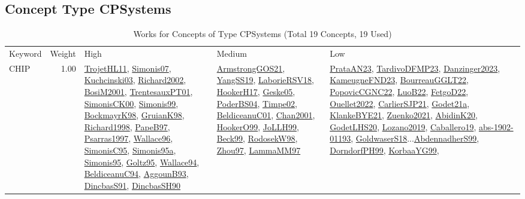 \subsection{Concept Type CPSystems}
\label{sec:CPSystems}
\label{CPSystems}
{\scriptsize
\begin{longtable}{p{3cm}r>{\raggedright\arraybackslash}p{6cm}>{\raggedright\arraybackslash}p{6cm}>{\raggedright\arraybackslash}p{8cm}}
\rowcolor{white}\caption{Works for Concepts of Type CPSystems (Total 19 Concepts, 19 Used)}\\ \toprule
\rowcolor{white}Keyword & Weight & High & Medium & Low\\ \midrule\endhead
\bottomrule
\endfoot
\index{CHIP}\index{CPSystems!CHIP}CHIP &  1.00 & \hyperref[detail:TrojetHL11]{TrojetHL11}, \hyperref[detail:Simonis07]{Simonis07}, \hyperref[detail:Kuchcinski03]{Kuchcinski03}, \hyperref[detail:Richard2002]{Richard2002}, \hyperref[detail:BosiM2001]{BosiM2001}, \hyperref[detail:TrentesauxPT01]{TrentesauxPT01}, \hyperref[detail:SimonisCK00]{SimonisCK00}, \hyperref[detail:Simonis99]{Simonis99}, \hyperref[detail:BockmayrK98]{BockmayrK98}, \hyperref[detail:GruianK98]{GruianK98}, \hyperref[detail:Richard1998]{Richard1998}, \hyperref[detail:PapeB97]{PapeB97}, \hyperref[detail:Psarras1997]{Psarras1997}, \hyperref[detail:Wallace96]{Wallace96}, \hyperref[detail:SimonisC95]{SimonisC95}, \hyperref[detail:Simonis95a]{Simonis95a}, \hyperref[detail:Simonis95]{Simonis95}, \hyperref[detail:Goltz95]{Goltz95}, \hyperref[detail:Wallace94]{Wallace94}, \hyperref[detail:BeldiceanuC94]{BeldiceanuC94}, \hyperref[detail:AggounB93]{AggounB93}, \hyperref[detail:DincbasS91]{DincbasS91}, \hyperref[detail:DincbasSH90]{DincbasSH90} & \hyperref[detail:ArmstrongGOS21]{ArmstrongGOS21}, \hyperref[detail:YangSS19]{YangSS19}, \hyperref[detail:LaborieRSV18]{LaborieRSV18}, \hyperref[detail:HookerH17]{HookerH17}, \hyperref[detail:Geske05]{Geske05}, \hyperref[detail:PoderBS04]{PoderBS04}, \hyperref[detail:Timpe02]{Timpe02}, \hyperref[detail:BeldiceanuC01]{BeldiceanuC01}, \hyperref[detail:Chan2001]{Chan2001}, \hyperref[detail:HookerO99]{HookerO99}, \hyperref[detail:JoLLH99]{JoLLH99}, \hyperref[detail:Beck99]{Beck99}, \hyperref[detail:RodosekW98]{RodosekW98}, \hyperref[detail:Zhou97]{Zhou97}, \hyperref[detail:LammaMM97]{LammaMM97} & \hyperref[detail:PrataAN23]{PrataAN23}, \hyperref[detail:TardivoDFMP23]{TardivoDFMP23}, \hyperref[detail:Danzinger2023]{Danzinger2023}, \hyperref[detail:KameugneFND23]{KameugneFND23}, \hyperref[detail:BourreauGGLT22]{BourreauGGLT22}, \hyperref[detail:PopovicCGNC22]{PopovicCGNC22}, \hyperref[detail:LuoB22]{LuoB22}, \hyperref[detail:FetgoD22]{FetgoD22}, \hyperref[detail:Ouellet2022]{Ouellet2022}, \hyperref[detail:CarlierSJP21]{CarlierSJP21}, \hyperref[detail:Godet21a]{Godet21a}, \hyperref[detail:KlankeBYE21]{KlankeBYE21}, \hyperref[detail:Zuenko2021]{Zuenko2021}, \hyperref[detail:AbidinK20]{AbidinK20}, \hyperref[detail:GodetLHS20]{GodetLHS20}, \hyperref[detail:Lozano2019]{Lozano2019}, \hyperref[detail:Caballero19]{Caballero19}, \hyperref[detail:abs-1902-01193]{abs-1902-01193}, \hyperref[detail:GoldwaserS18]{GoldwaserS18}...\hyperref[detail:AbdennadherS99]{AbdennadherS99}, \hyperref[detail:DorndorfPH99]{DorndorfPH99}, \hyperref[detail:KorbaaYG99]{KorbaaYG99}, 
\end{longtable}}
